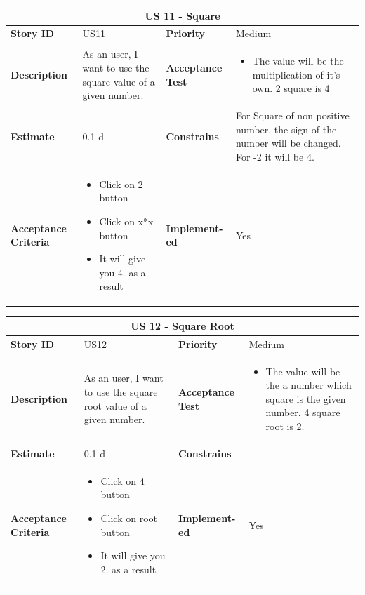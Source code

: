 \documentclass{article}
\begin{document}
\begin{tabular}{ |p{2cm}|p{5cm}|p{2cm}|p{4cm}| }
 \hline
 \multicolumn{4}{|c|}{US 11 -  Square} \\
 \hline
 \textbf {Story ID}& US11 &  \textbf{Priority} & Medium \\
 \hline
  \textbf{Description}   & As an user, I want to use the square value of a given number. &    \textbf{Acceptance Test}& 
\begin{itemize}
\item  The value will be the multiplication of it's own. 2 square is 4
\end{itemize}
  \\
 \hline
 \textbf{Estimate} & 0.1 d &  \textbf{Constrains}&  For Square of non positive number, the sign of the number will be changed. For -2 it will be 4.  \\
\hline
 \textbf{Acceptance Criteria} & 
 \begin{itemize}
\item Click on 2 button
\item Click on x*x button
\item It will give you 4. as a result 
\end{itemize}
 &  \textbf{Implement- ed}& Yes  \\
 \hline
\end{tabular}

\begin{tabular}{ |p{2cm}|p{5cm}|p{2cm}|p{4cm}| }
 \hline
 \multicolumn{4}{|c|}{US 12 -  Square Root} \\
 \hline
 \textbf {Story ID}& US12 &  \textbf{Priority} & Medium \\
 \hline
  \textbf{Description}   & As an user, I want to use the square root value of a given number. &    \textbf{Acceptance Test}& 
\begin{itemize}
\item  The value will be the a number which square is the given number. 4 square root is 2.  
\end{itemize}
  \\
 \hline
 \textbf{Estimate} & 0.1 d &  \textbf{Constrains}&    \\
 \hline
 \textbf{Acceptance Criteria} & 
 \begin{itemize}
\item Click on 4 button
\item Click on root button
\item It will give you 2. as a result 
\end{itemize}
 &  \textbf{Implement- ed}& Yes  \\
 \hline
\end{tabular}
\end{document}
